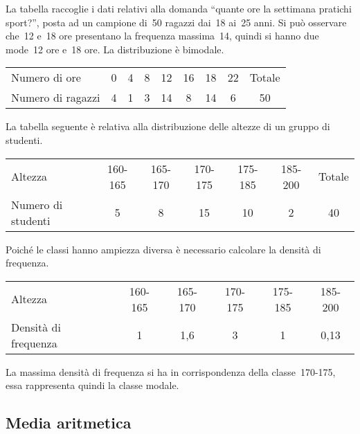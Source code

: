 \begin{exrig}

\begin{esempio}
La tabella raccoglie i dati relativi alla domanda ``quante ore la settimana 
pratichi sport?'', posta ad un
campione di~50 ragazzi dai~18 ai~25 anni. Si può osservare che~12 e~18 ore 
presentano la frequenza massima~14, quindi si hanno due
mode~12 ore e~18 ore. La distribuzione è bimodale.


\begin{center}
\begin{tabular}{lcccccccc}
\toprule
Numero di ore & 0 &4 &8 &12 &16 &18 &22 &Totale\\
 Numero di ragazzi& 4 & 1 & 3 & 14 & 8 & 14 & 6 & 50 \\
\bottomrule
\end{tabular}
\end{center}
 \end{esempio}

 \begin{esempio}
La tabella seguente è relativa alla distribuzione delle altezze di un 
gruppo di studenti.

\begin{center}
\begin{tabular}{lcccccc}
\toprule
Altezza &160-165 &165-170 &170-175 &175-185 &185-200 &Totale \\
Numero di studenti & 5 & 8 & 15 & 10 & 2 & 40 \\
\bottomrule
\end{tabular}
\end{center}
Poiché le classi hanno ampiezza diversa è necessario calcolare la densità 
di frequenza.

\begin{center}
\begin{tabular}{lccccc}
\toprule
Altezza &160-165 &165-170 &170-175 &175-185 &185-200 \\
Densità di frequenza & 1 & 1,6 & 3 & 1 & 0,13 \\
\bottomrule
\end{tabular}
\end{center}
La massima densità di frequenza si ha in corrispondenza della 
classe~170-175, essa rappresenta quindi la classe modale.
 \end{esempio}
\end{exrig}

\subsection{Media aritmetica}

